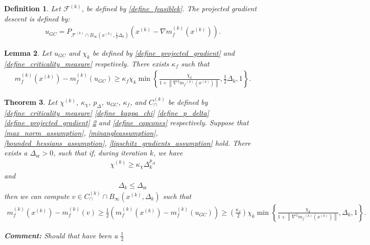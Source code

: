 \documentclass{article}
\newenvironment{comment}
  {\par\medskip
   \color{red}%
   \begin{framed}
   \textbf{Comment: }\ignorespaces}
 {\end{framed}
  \medskip}
\newtheorem{theorem}{Theorem}[section]
\newtheorem{definition}[theorem]{Definition}
\newtheorem{lemma}[theorem]{Lemma}
\theoremstyle{case}
\numberwithin{theorem}{subsection}
\newcommand{\capcones}{{C^{(k)}_{\cap}}}
\newcommand{\chik}{{\chi^{(k)}}}
\newcommand{\dk}{\Delta_k}
\newcommand{\dsr}{{\Delta_{\textrm{sr}}}}
\newcommand{\feasiblek}{{\mathcal F^{(k)}}}
\newcommand{\gk}{{\nabla m_f^{(k)}\left(\xk\right)}}
\newcommand{\mfk}{{{m}_f}^{(k)}}
\newcommand{\tr}{{ B_{\infty}\left(\xk, \dk\right) }}
\newcommand{\xk}{x^{(k)}}
\begin{document}
\begin{definition}
Let $\feasiblek$, be defined by \cref{define_feasiblek}.
The projected gradient descent is defined by:
\begin{align}
u_{GC} = P_{\feasiblek\cap B_{\infty}\left(\xk, \frac 1 2 \dk\right)}\left(\xk-\gk\right) \label{define_projected_gradient}.
\end{align}
\end{definition}

\begin{lemma}
\label{sufficient_reduction_of_projected_gradient}
Let 
$u_{GC}$ and $\chi_k$
be defined by
\cref{define_projected_gradient} and \cref{define_criticality_measure}
respetively.
There exists $\kappa_{f}$ such that
\begin{align*}
m_f^{(k)}\left(\xk\right) - m_f^{(k)}\left(u_{GC}\right) \ge \kappa_f\chi_k \min\left\{ \frac{\chi_k}{1+\left\|\nabla^2 \mfk(\xk)\right\|}, \frac 1 2 \dk, 1 \right\}.
\end{align*}
\end{lemma}




\begin{theorem}
\label{sufficient_reduction_theorem}
Let 
$\chik$,
$\kappa_{\chi}$,
$p_{\Delta}$,
$u_{GC}$,
$\kappa_f$,
and $\capcones$
be defined by
\cref{define_criticality_measure}
\cref{define_kappa_chi}
\cref{define_p_delta}
\cref{define_projected_gradient}
\cref{sufficient_reduction_of_projected_gradient}
and \cref{define_capcones}
respectively.
Suppose that
\cref{max_norm_assumption},
\cref{minangleassumption},
\cref{bounded_hessians_assumption},
\cref{lipschitz_gradients_assumption}
hold.
There exists a $\dsr > 0$, such that if, during iteration $k$, we have
\begin{align}
\chik \ge \kappa_{\chi} \dk^{p_{\Delta}} \label{sr_chi_big_enough}
\end{align}
and
\begin{align}
\dk \le \dsr \label{sr_delta_small_enough}
\end{align}
then we can compute $v \in \capcones \cap \tr$ such that
\begin{align*}
m_f^{(k)}(\xk) - m_f^{(k)}(v) \ge \frac 1 2 \left(m_f^{(k)}(\xk) - m_f^{(k)}(u_{GC})\right) \ge \left(\frac{\kappa_f}{2} \right)\chi_k \min\left\{ \frac{\chi_k}{1+\left\|\nabla^2 \mfk(\xk)\right\|}, \dk, 1 \right\}.
\end{align*}

\begin{comment}
Should that have been a $\frac 1 2$
\end{comment}

\end{theorem}
\end{document}
